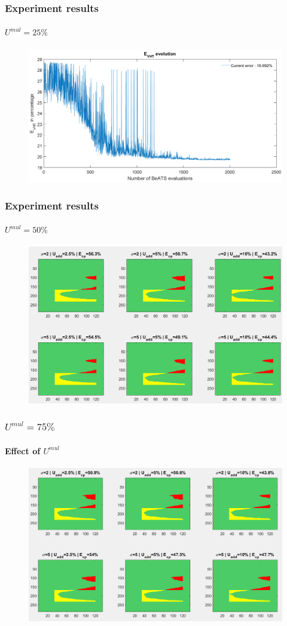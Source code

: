 \documentclass[fleqn]{beamer}
\begin{document}
\begin{frame}
	\frametitle{Experiment results}
	\framesubtitle{$U^{mul}=25\% $}
	\begin{figure}
		\centering
		\includegraphics[width=4.5in]{figures/results_figures/Umul/bad_vht.png}
	\end{figure}
\end{frame}

\begin{frame}
	\frametitle{Experiment results}
	\framesubtitle{$U^{mul}=50\% $}
	\begin{figure}
		\centering
		\includegraphics[width=4.5in]{figures/results_figures/Umul/cp_Umul_50_lambda_11.png}
	\end{figure}
\end{frame}

\begin{frame}
	\frametitle{$U^{mul}=75\% $}
	\framesubtitle{Effect of $U^{mul}$}
	\begin{figure}
		\centering
		\includegraphics[width=4.5in]{figures/results_figures/Umul/cp_Umul_75_lambda_11.png}
	\end{figure}
\end{frame}
\end{document}
